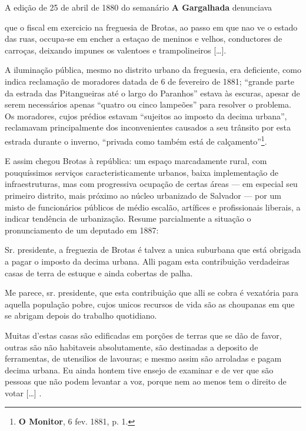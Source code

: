 A edição de 25 de abril de 1880 do semanário \textbf{A Gargalhada} denunciava

\begin{citacao}
que o fiscal em exercicio na freguesia de Brotas, ao passo em que nao ve o estado das ruas, occupa-se em encher a estaçao de meninos e velhos, conductores de carroças, deixando impunes os valentoes e trampolineiros [\dots].
\end{citacao}

A iluminação pública, mesmo no distrito urbano da freguesia, era deficiente, como indica reclamação de moradores datada de 6 de fevereiro de 1881; ``grande parte da estrada das Pitangueiras até o largo do Paranhos'' estava às escuras, apesar de serem necessários apenas ``quatro ou cinco lampeões'' para resolver o problema. Os moradores, cujos prédios estavam ``sujeitos ao imposto da decima urbana'', reclamavam principalmente dos inconvenientes causados a seu trânsito por esta estrada durante o inverno, ``privada como também está de calçamento''\footnote{\textbf{O Monitor}, 6 fev. 1881, p. 1.}.

E assim chegou Brotas à república: um espaço marcadamente rural, com pouquíssimos serviços caracteristicamente urbanos, baixa implementação de infraestruturas, mas com progressiva ocupação de certas áreas --- em especial seu primeiro distrito, mais próximo ao núcleo urbanizado de Salvador --- por um misto de funcionários públicos de médio escalão, artífices e profissionais liberais, a indicar tendência de urbanização. Resume parcialmente a situação o pronunciamento de um deputado em 1887:

\begin{citacao}
Sr. presidente, a freguezia de Brotas é talvez a unica suburbana que está obrigada a pagar o imposto da decima urbana. Alli pagam esta contribuição verdadeiras casas de terra de estuque e ainda cobertas de palha.

Me parece, sr. presidente, que esta contribuição que alli se cobra é vexatória para aquella população pobre, cujos unicos recursos de vida são as choupanas em que se abrigam depois do trabalho quotidiano.

Muitas d'estas casas são edificadas em porções de terras que se dão de favor, outras são não habitaveis absolutamente, são destinadas a deposito de ferramentas, de utensilios de lavouras; e mesmo assim são arroladas e pagam decima urbana. Eu ainda hontem tive ensejo de examinar e de ver que são pessoas que não podem levantar a voz, porque nem ao menos tem o direito de votar [\dots] \cite[p.~335]{bahia_assembleia_1887}.
\end{citacao}

